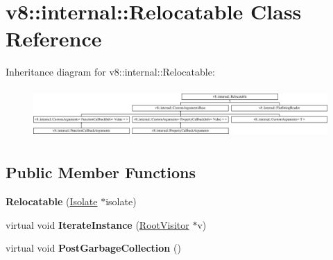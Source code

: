 \hypertarget{classv8_1_1internal_1_1Relocatable}{}\section{v8\+:\+:internal\+:\+:Relocatable Class Reference}
\label{classv8_1_1internal_1_1Relocatable}
Inheritance diagram for v8\+:\+:internal\+:\+:Relocatable\+:\begin{figure}[H]
\begin{center}
\leavevmode
\includegraphics[height=1.919452cm]{classv8_1_1internal_1_1Relocatable}
\end{center}
\end{figure}
\subsection*{Public Member Functions}
\begin{DoxyCompactItemize}
\item 
\mbox{\label{classv8_1_1internal_1_1Relocatable_a04289a02886c91a77a9908fe84392401}} 
{\bfseries Relocatable} (\mbox{\hyperlink{classv8_1_1internal_1_1Isolate}{Isolate}} $\ast$isolate)
\item 
\mbox{\label{classv8_1_1internal_1_1Relocatable_ad28c718d847f9a370554ca9da22a4792}} 
virtual void {\bfseries Iterate\+Instance} (\mbox{\hyperlink{classv8_1_1internal_1_1RootVisitor}{Root\+Visitor}} $\ast$v)
\item 
\mbox{\label{classv8_1_1internal_1_1Relocatable_a85736384151917d3dfc95c679a5481b2}} 
virtual void {\bfseries Post\+Garbage\+Collection} ()
\end{DoxyCompactItemize}
